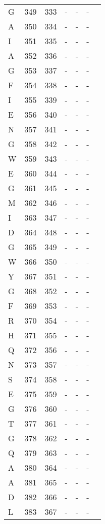 \begin{longtable}{lllllll}
  G & 349 & 333 & - & - & - &  \\ 
  A & 350 & 334 & - & - & - &  \\ 
  I & 351 & 335 & - & - & - &  \\ 
  A & 352 & 336 & - & - & - &  \\ 
  G & 353 & 337 & - & - & - &  \\ 
  F & 354 & 338 & - & - & - &  \\ 
  I & 355 & 339 & - & - & - &  \\ 
  E & 356 & 340 & - & - & - &  \\ 
  N & 357 & 341 & - & - & - &  \\ 
  G & 358 & 342 & - & - & - &  \\ 
  W & 359 & 343 & - & - & - &  \\ 
  E & 360 & 344 & - & - & - &  \\ 
  G & 361 & 345 & - & - & - &  \\ 
  M & 362 & 346 & - & - & - &  \\ 
  I & 363 & 347 & - & - & - &  \\ 
  D & 364 & 348 & - & - & - &  \\ 
  G & 365 & 349 & - & - & - &  \\ 
  W & 366 & 350 & - & - & - &  \\ 
  Y & 367 & 351 & - & - & - &  \\ 
  G & 368 & 352 & - & - & - &  \\ 
  F & 369 & 353 & - & - & - &  \\ 
  R & 370 & 354 & - & - & - &  \\ 
  H & 371 & 355 & - & - & - &  \\ 
  Q & 372 & 356 & - & - & - &  \\ 
  N & 373 & 357 & - & - & - &  \\ 
  S & 374 & 358 & - & - & - &  \\ 
  E & 375 & 359 & - & - & - &  \\ 
  G & 376 & 360 & - & - & - &  \\ 
  T & 377 & 361 & - & - & - &  \\ 
  G & 378 & 362 & - & - & - &  \\ 
  Q & 379 & 363 & - & - & - &  \\ 
  A & 380 & 364 & - & - & - &  \\ 
  A & 381 & 365 & - & - & - &  \\ 
  D & 382 & 366 & - & - & - &  \\ 
  L & 383 & 367 & - & - & - &  \\ 

\end{longtable}
